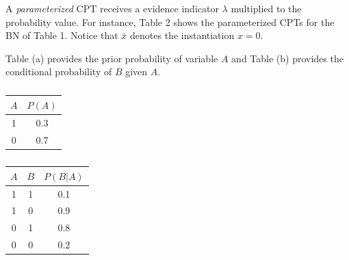 \documentclass[twoside,11pt]{article}
\begin{document}
A \emph{parameterized} CPT receives a evidence indicator $\lambda$ multiplied to the probability value.
For instance, Table 2 shows the parameterized CPTs for the BN of Table 1.
Notice that $\bar x$ denotes the instantiation $x = 0$.

\begin{table}[!htb]
    \label{subtb:pa}
    \caption{Table (a) provides the prior probability of variable $A$ and Table (b) provides the conditional probability of $B$ given $A$.}
    \begin{subtable}{.5\linewidth}
      \centering
        \caption{}
        \begin{tabular}{c|c}
            $A$ & $P(A)$ \\ \hline
            1 & 0.3 \\
            0 & 0.7
        \end{tabular}
    \end{subtable}%
    \begin{subtable}{.5\linewidth}
      \centering
        \caption{}
        \begin{tabular}{cc|c}
            $A$ & $B$ & $P(B|A)$ \\ \hline
            1 & 1 & 0.1 \\
            1 & 0 & 0.9 \\
            0 & 1 & 0.8 \\
            0 & 0 & 0.2 \\
        \end{tabular}
    \end{subtable} 
\end{table}






\end{document}
